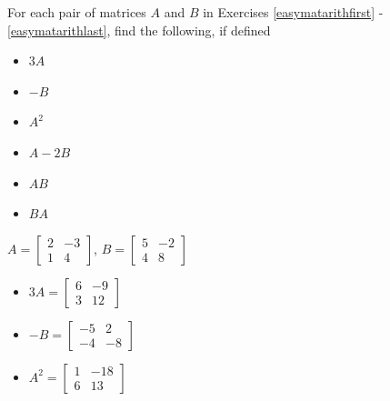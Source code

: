 \documentclass{ximera}
\begin{document}
	\author{Stitz-Zeager}



\label{ExercisesforMatArithmetic}

\begin{question}
For each pair of matrices $A$ and $B$ in  Exercises \ref{easymatarithfirst} - \ref{easymatarithlast}, find the following, if defined

\begin{itemize}
\item  $3A$

\item $-B$

\item $A^2$

\item  $A-2B$

\item $AB$

\item $BA$

\end{itemize}


\begin{problem}\label{easymatarithfirst}
$A = \left[ \begin{array}{rr} 2 & -3 \\ 1 & 4 \end{array} \right]$, $B=\left[ \begin{array}{rr} 5 & -2 \\ 4 & 8 \end{array} \right]$

\begin{solution}
\begin{itemize}
\item  $3A = \left[ \begin{array}{rr} 6 & -9 \\ 3 & 12 \end{array} \right]$

\item $-B = \left[ \begin{array}{rr} -5 & 2 \\ -4 & -8 \end{array} \right]$

\item $A^2 = \left[ \begin{array}{rr} 1 & -18 \\ 6 & 13 \end{array} \right]$


\end{itemize}
\end{solution}
\end{problem}
\end{question}
\end{document}
